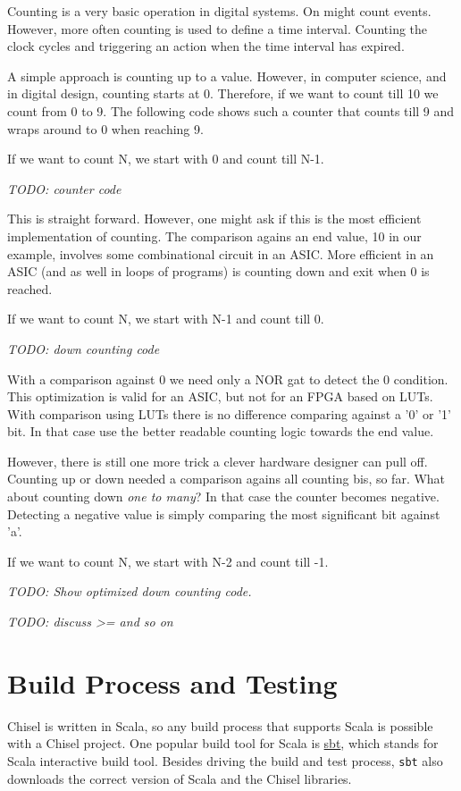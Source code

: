 \documentclass[%
    11pt, %
    headinclude, footexclude,
    openright, %
    notitlepage,
    cleardoubleempty,
    headsepline,
    pointlessnumbers,
    bibtotoc, idxtotoc,
    ]{scrbook}
\newcommand{\code}[1]{{\small{\texttt{#1}}}}
\newcommand{\todo}[1]{{\emph{TODO: #1}}}
\begin{document}
Counting is a very basic operation in digital systems. On might count events.
However, more often counting is used to define a time interval. Counting the
clock cycles and triggering an action when the time interval has expired.

A simple approach is counting up to a value. However, in computer science,
and in digital design, counting starts at 0. Therefore, if we want to count till
10 we count from 0 to 9. The following code shows such a counter that counts
till 9 and wraps around to 0 when reaching 9.

If we want to count N, we start with 0 and count till N-1.

\todo{counter code}



This is straight forward. However, one might ask if this is the most efficient
implementation of counting. The comparison agains an end value, 10 in our
example, involves some combinational circuit in an ASIC. More efficient in an
ASIC (and as well in loops of programs) is counting down and exit when 0
is reached.

If we want to count N, we start with N-1 and count till 0.

\todo{down counting code}

With a comparison against 0 we need only a NOR gat to detect the 0 condition.
This optimization is valid for an ASIC, but not for an FPGA based on LUTs.
With comparison using LUTs there is no difference comparing against a '0' or
'1' bit. In that case use the better readable counting logic towards the end value.

However, there is still one more trick a clever hardware designer can pull off.
Counting up or down needed a comparison agains all counting bis, so far.
What about counting down \emph{one to many}? In that case the counter
becomes negative. Detecting a negative value is simply comparing the
most significant bit against 'a'.

If we want to count N, we start with N-2 and count till -1.

\todo{Show optimized down counting code.}


\todo{discuss >= and so on}

\chapter{Build Process and Testing}

Chisel is written in Scala, so any build process that supports Scala is possible
with a Chisel project. One popular build tool for Scala is \href{https://www.scala-sbt.org/}{sbt},
which stands for Scala interactive build tool.
Besides driving the build and test process, \code{sbt} also downloads the correct
version of Scala and the Chisel libraries.
\end{document}
